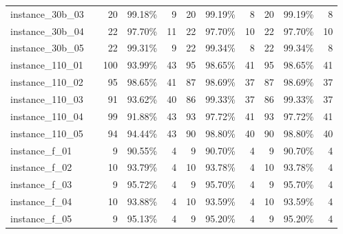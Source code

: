 \documentclass[12pt,a4paper,openright,twoside]{book}
\begin{document}
\begin{table}[H]
{\begin{tabular}{|ll|rrr|rrr|rrr|}
instance\_30b\_03              &       &   20  &    99.18\%  &   9     &   20  &    99.19\%  &   8     &   20   &   99.19\%  &   8  \\      
instance\_30b\_04              &       &   22  &    97.70\%  &   11    &   22  &    97.70\%  &   10    &   22  &   97.70\%  &   10  \\        
instance\_30b\_05              &       &   22  &    99.31\%  &   9     &   22  &    99.34\%  &   8     &   22   &   99.34\%  &   8  \\      
instance\_110\_01             &       &   100  &  93.99\%  &   43     &   95  &  98.65\%  &   41      &   95 &   98.65\%  &   41  \\         
instance\_110\_02             &       &   95  &  98.65\%  &   41      &   87  &   98.69\%  &   37     &   87  &   98.69\%  &   37  \\         
instance\_110\_03             &       &   91  &   93.62\%  &   40     &   86  &   99.33\%  &   37     &   86  &   99.33\%  &   37  \\       
instance\_110\_04             &       &   99  &   91.88\%  &   43     &   93  &   97.72\%  &   41     &   93  &   97.72\%  &   41  \\       
instance\_110\_05             &       &   94  &  94.44\%  &   43      &   90  &  98.80\%  &   40      &   90 &   98.80\%  &   40  \\
instance\_f\_01               &       &   9  &    90.55\%  &   4      &   9  &    90.70\%  &   4      &   9   &   90.70\%  &   4  \\  
instance\_f\_02               &       &   10  &    93.79\%  &   4     &   10  &    93.78\%  &   4     &   10   &   93.78\%  &   4  \\      
instance\_f\_03               &       &   9  &    95.72\%  &   4      &   9  &    95.70\%  &   4      &   9   &   95.70\%  &   4  \\  
instance\_f\_04               &       &   10  &    93.88\%  &   4     &   10  &    93.59\%  &   4     &   10   &   93.59\%  &   4  \\      
instance\_f\_05               &       &   9  &    95.13\%  &   4      &   9  &    95.20\%  &   4      &   9   &   95.20\%  &   4  \\
 \hline
\end{tabular}
}
\end{table}
\end{document}
